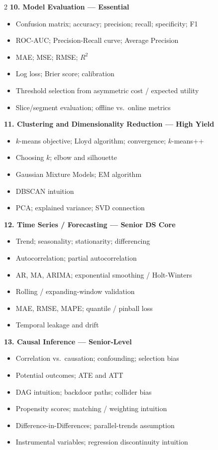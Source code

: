 \documentclass[9pt,a4paper]{article}
\newcommand{\topic}[1]{%
    \vspace{2.2mm}
    {\large\bfseries #1}\par
    \vspace{0.5mm}
}
\begin{document}
\begin{multicols}{2}
\topic{10. Model Evaluation --- Essential}
\begin{itemize}
    \item Confusion matrix; accuracy; precision; recall; specificity; F1
    \item ROC-AUC; Precision-Recall curve; Average Precision
    \item MAE; MSE; RMSE; $R^2$
    \item Log loss; Brier score; calibration
    \item Threshold selection from asymmetric cost / expected utility
    \item Slice/segment evaluation; offline vs.\ online metrics
\end{itemize}

\topic{11. Clustering and Dimensionality Reduction --- High Yield}
\begin{itemize}
    \item $k$-means objective; Lloyd algorithm; convergence; $k$-means++
    \item Choosing $k$; elbow and silhouette
    \item Gaussian Mixture Models; EM algorithm
    \item DBSCAN intuition
    \item PCA; explained variance; SVD connection
\end{itemize}

\topic{12. Time Series / Forecasting --- Senior DS Core}
\begin{itemize}
    \item Trend; seasonality; stationarity; differencing
    \item Autocorrelation; partial autocorrelation
    \item AR, MA, ARIMA; exponential smoothing / Holt-Winters
    \item Rolling / expanding-window validation
    \item MAE, RMSE, MAPE; quantile / pinball loss
    \item Temporal leakage and drift
\end{itemize}

\topic{13. Causal Inference --- Senior-Level}
\begin{itemize}
    \item Correlation vs.\ causation; confounding; selection bias
    \item Potential outcomes; ATE and ATT
    \item DAG intuition; backdoor paths; collider bias
    \item Propensity scores; matching / weighting intuition
    \item Difference-in-Differences; parallel-trends assumption
    \item Instrumental variables; regression discontinuity intuition
\end{itemize}


\end{multicols}
\end{document}
